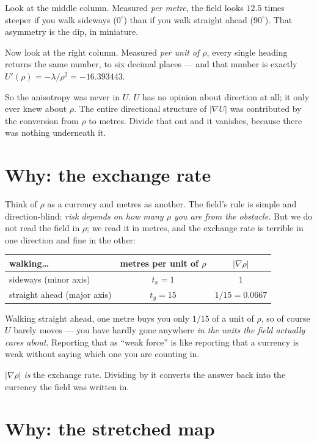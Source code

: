 \documentclass[11pt]{article}
\begin{document}
Look at the middle column. Measured \emph{per metre}, the field looks
$12.5$ times steeper if you walk sideways ($0^{\circ}$) than if you walk
straight ahead ($90^{\circ}$). That asymmetry is the dip, in miniature.

Now look at the right column. Measured \emph{per unit of $\rho$}, every
single heading returns the same number, to six decimal places --- and that
number is exactly $U'(\rho)=-\lambda/\rho^{2}=-16.393443$.

So the anisotropy was never in $U$. $U$ has no opinion about direction at
all; it only ever knew about $\rho$. The entire directional structure of
$|\nabla U|$ was contributed by the conversion from $\rho$ to metres. Divide
that out and it vanishes, because there was nothing underneath it.

\section{Why: the exchange rate}

Think of $\rho$ as a currency and metres as another. The field's rule is
simple and direction-blind: \emph{risk depends on how many $\rho$ you are
from the obstacle.} But we do not read the field in $\rho$; we read it in
metres, and the exchange rate is terrible in one direction and fine in the
other:

\begin{center}
\begin{tabular}{lcc}
\toprule
walking\ldots & metres per unit of $\rho$ & $|\nabla\rho|$\\
\midrule
sideways (minor axis)        & $t_{x}=1$  & $1$\\
straight ahead (major axis)  & $t_{y}=15$ & $1/15=0.0667$\\
\bottomrule
\end{tabular}
\end{center}

Walking straight ahead, one metre buys you only $1/15$ of a unit of $\rho$,
so of course $U$ barely moves --- you have hardly gone anywhere \emph{in the
units the field actually cares about}. Reporting that as ``weak force'' is
like reporting that a currency is weak without saying which one you are
counting in.

$|\nabla\rho|$ \emph{is} the exchange rate. Dividing by it converts the
answer back into the currency the field was written in.

\section{Why: the stretched map}
\end{document}
